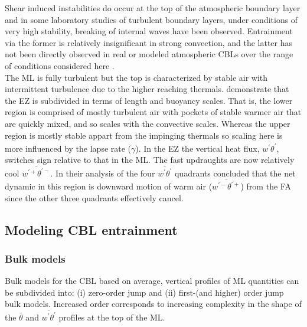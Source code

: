 Shear induced instabilities do occur at the top of the atmospheric boundary layer and in some laboratory studies of turbulent boundary layers, under conditions of very high stability, breaking of internal waves have been observed.  Entrainment via the former is relatively insignificant in strong convection, and the latter has not been directly observed in real or modeled atmospheric CBLs over the range of conditions considered here \citep{Traum11, SullMoengStev}.\\

The ML is fully turbulent but the top is characterized by stable air with intermittent turbulence due to the higher reaching thermals. \cite{GarciaMellado} demonstrate that the EZ is subdivided in terms of length and buoyancy scales.  That is, the lower region is comprised of mostly turbulent air with pockets of stable warmer air that are quickly mixed, and so scales with the convective scales. Whereas the upper region is mostly stable appart from the impinging thermals so scaling here is more influenced by the lapse rate ($\gamma$).  In the EZ the vertical heat flux, $\overline{w^{'}\theta^{'}}$, switches sign relative to that in the ML.  The fast updraughts are now relatively cool $\overline{w^{'+}\theta^{'-}}$.  In their analysis of the four $\overline{w^{'}\theta^{'}}$ quadrants \cite{SullMoengStev} concluded that the net dynamic in this region is downward motion of warm air ($\overline{w^{'-}\theta^{'+}}$) from the FA since the other three quadrants effectively cancel.\\

\subsection{Modeling CBL entrainment}

\subsubsection{Bulk models}
\label{subsubsec:bulkmod}

Bulk  models for the CBL based on average, vertical profiles of ML quantities can be subdivided into: (i) zero-order jump and (ii) first-(and higher) order jump bulk models.  Increased order corresponds to increasing complexity in the shape of the  $\overline{\theta}$ and $\overline{w^{'}\theta^{'}}$ profiles at the top of the ML.\\
 
